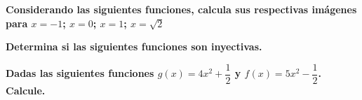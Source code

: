 \documentclass[11pt, addpoints, answers]{exam}
\begin{document}
	
	
	
	
	\vspace{1 cm}
	
	\begin{questions}
	\question[1] \textbf{	Considerando las siguientes funciones, calcula sus respectivas imágenes para $x = -1$; $x = 0 $; $x = 1 $; $x =\sqrt{2}$ }
		\question[1] \textbf{Determina si las siguientes funciones son inyectivas.}
			\question[1] \textbf{Dadas las siguientes funciones $g(x)=4x^{2}+\dfrac{1}{2}$  y   $f(x)=5x^{2}-\dfrac{1}{2}$. Calcule.}
\end{questions}
\end{document}
